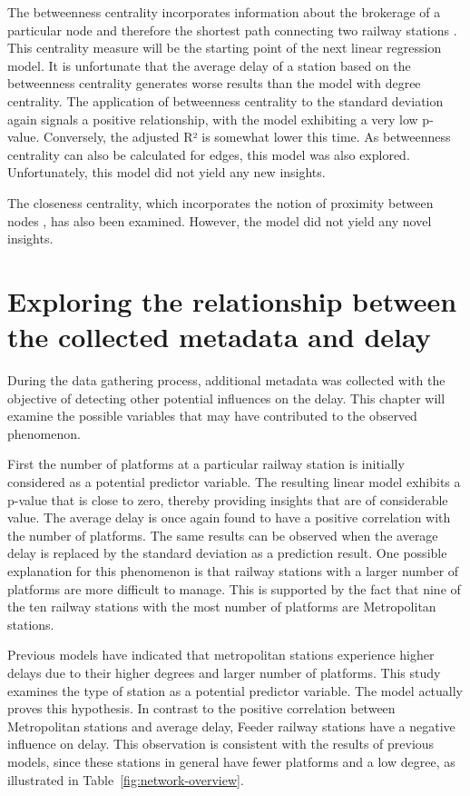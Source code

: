 \documentclass[12pt,a4paper]{article}
\begin{document}
The betweenness centrality incorporates information about the brokerage of a particular node and therefore the shortest path connecting two railway stations \citep[p.~35]{Linton}. This centrality measure will be the starting point of the next linear regression model. It is unfortunate that the average delay of a station based on the betweenness centrality generates worse results than the model with degree centrality. The application of betweenness centrality to the standard deviation again signals a positive relationship, with the model exhibiting a very low p-value. Conversely, the adjusted R² is somewhat lower this time. As betweenness centrality can also be calculated for edges, this model was also explored. Unfortunately, this model did not yield any new insights. 

The closeness centrality, which incorporates the notion of proximity between nodes \citep[p.~180]{Rodrigues2019}, has also been examined. However, the model did not yield any novel insights.

\maketitle
\section{\label{sec:RealtionshipMeta}Exploring the relationship between the collected metadata and delay}

During the data gathering process, additional metadata was collected with the objective of detecting other potential influences on the delay. 
This chapter will examine the possible variables that may have contributed to the observed phenomenon.

First the number of platforms at a particular railway station is initially considered as a potential predictor variable. The resulting linear model exhibits a p-value that is close to zero, thereby providing insights that are of considerable value. The average delay is once again found to have a positive correlation with the number of platforms. The same results can be observed when the average delay is replaced by the standard deviation as a prediction result. One possible explanation for this phenomenon is that railway stations with a larger number of platforms are more difficult to manage.
This is supported by the fact that nine of the ten railway stations with the most number of platforms are Metropolitan stations.

Previous models have indicated that metropolitan stations experience higher delays due to their higher degrees and larger number of platforms. This study examines the type of station as a potential predictor variable. The model actually proves this hypothesis. In contrast to the positive correlation between Metropolitan stations and average delay, Feeder railway stations have a negative influence on delay. 
This observation is consistent with the results of previous models, since these stations in general have fewer platforms and a low degree, as illustrated in Table~\ref{fig:network-overview}.
\end{document}
